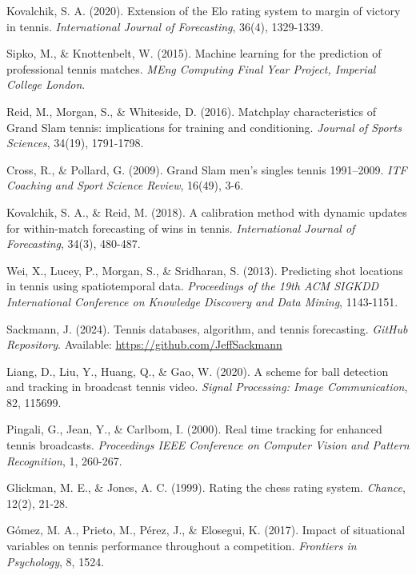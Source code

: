 \documentclass[11pt,a4paper]{article}
\begin{document}

\begin{thebibliography}{99}

Kovalchik, S. A. (2020). Extension of the Elo rating system to margin of victory in tennis. \textit{International Journal of Forecasting}, 36(4), 1329-1339.

Sipko, M., \& Knottenbelt, W. (2015). Machine learning for the prediction of professional tennis matches. \textit{MEng Computing Final Year Project, Imperial College London}.

Reid, M., Morgan, S., \& Whiteside, D. (2016). Matchplay characteristics of Grand Slam tennis: implications for training and conditioning. \textit{Journal of Sports Sciences}, 34(19), 1791-1798.

Cross, R., \& Pollard, G. (2009). Grand Slam men's singles tennis 1991–2009. \textit{ITF Coaching and Sport Science Review}, 16(49), 3-6.

Kovalchik, S. A., \& Reid, M. (2018). A calibration method with dynamic updates for within-match forecasting of wins in tennis. \textit{International Journal of Forecasting}, 34(3), 480-487.

Wei, X., Lucey, P., Morgan, S., \& Sridharan, S. (2013). Predicting shot locations in tennis using spatiotemporal data. \textit{Proceedings of the 19th ACM SIGKDD International Conference on Knowledge Discovery and Data Mining}, 1143-1151.

Sackmann, J. (2024). Tennis databases, algorithm, and tennis forecasting. \textit{GitHub Repository}. Available: \url{https://github.com/JeffSackmann}

Liang, D., Liu, Y., Huang, Q., \& Gao, W. (2020). A scheme for ball detection and tracking in broadcast tennis video. \textit{Signal Processing: Image Communication}, 82, 115699.

Pingali, G., Jean, Y., \& Carlbom, I. (2000). Real time tracking for enhanced tennis broadcasts. \textit{Proceedings IEEE Conference on Computer Vision and Pattern Recognition}, 1, 260-267.

Glickman, M. E., \& Jones, A. C. (1999). Rating the chess rating system. \textit{Chance}, 12(2), 21-28.

Gómez, M. A., Prieto, M., Pérez, J., \& Elosegui, K. (2017). Impact of situational variables on tennis performance throughout a competition. \textit{Frontiers in Psychology}, 8, 1524.


\end{thebibliography}
\end{document}
